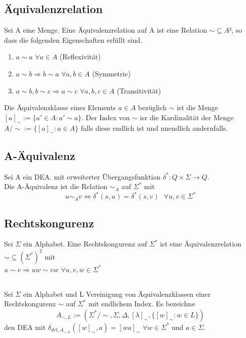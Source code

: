 \documentclass[DIV=15]{scrartcl}
\begin{document}
    \subsection{Äquivalenzrelation}
        Sei A eine Menge. Eine Äquivalenzrelation auf A ist eine Relation \(\sim\subseteq A²\), so dass
        die folgenden Eigenschaften erfüllt sind.
        \begin{enumerate}
            \item \(a\sim a\) \(\forall a\in A\) (Reflexivität)
            \item \(a\sim b\Rightarrow b\sim a\) \(\forall a,b \in A\) (Symmetrie)
            \item \(a\sim b, b\sim c\Rightarrow a\sim c\) \(\forall a,b,c\in A\) (Transitivität)
        \end{enumerate}
        Die Äquivalenzklasse eines Elements \(a\in A\) bezüglich \(\sim\) ist die Menge 
        \([a]_\sim:=\{a'\in A:a'\sim a\}\). Der Index von \(\sim\) isr die Kardinalität
        der Menge \(A/{\sim}:=\{[a]_\sim:a\in A\}\) falls diese endlich ist und unendlich andernfalls.
    \subsection{A-Äquivalenz}
        Sei A ein DEA. mit erweiterter Übergangsfunktion \(\delta^*:Q\times\Sigma\to Q\).\\
        Die A-Äquivalenz ist die Relation \(\sim_A\) auf \(\Sigma^*\) mit 
        \[u\sim_A v\Leftrightarrow \delta^*(s,u)=\delta^*(s,v)\text{ }\forall u,v\in\Sigma^*\]
    \subsection{Rechtskongurenz}
        Sei \(\Sigma\) ein Alphabet. Eine Rechtskongurenz auf \(\Sigma^*\) ist eine Äquivalenzrelation
        \(\sim\subseteq(\Sigma^*)^2\) mit \\
        \(u\sim v\Rightarrow uw\sim vw\) \(\forall u,v,w\in\Sigma^*\)
    \subsection{}
        Sei \(\Sigma\) ein Alphabet und L Vereinigung von Äquivalenzklassen einer Rechtskongurenz \(\sim\)
        auf \(\Sigma^*\) mit endlichem Index. Es bezeichne 
        \[A_{\sim,L}:=(\Sigma^*/{\sim},\Sigma,\Delta,[\lambda]_\sim,\{[w]_\sim:w\in L\})\]
        den DEA mit \(\delta_{det,A_{\sim,L}}([w]_\sim,a)=[wa]_\sim\) \(\forall w\in\Sigma^*\) und \(a\in\Sigma\).
\end{document}
